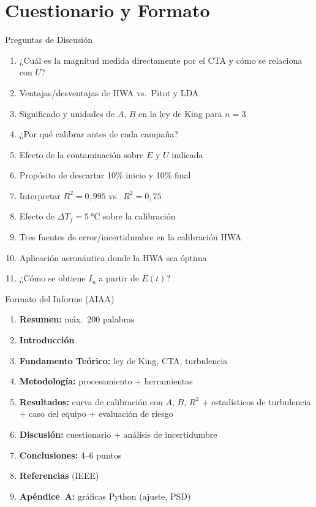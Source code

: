 \documentclass[aspectratio=169,12pt]{beamer}
\begin{document}
\section{Cuestionario y Formato}

\begin{frame}{Preguntas de Discusión}
	\begin{enumerate}\small
		\item ¿Cuál es la magnitud medida directamente por el CTA
		      y cómo se relaciona con $U$?
		\item Ventajas/desventajas de HWA vs.\ Pitot y LDA
		\item Significado y unidades de $A$, $B$ en la ley de King
		      para $n=3$
		\item ¿Por qué calibrar antes de cada campaña?
		\item Efecto de la contaminación sobre $E$ y $U$ indicada
		\item Propósito de descartar 10\% inicio y 10\% final
		\item Interpretar $R^2 = 0{,}995$ vs.\ $R^2 = 0{,}75$
		\item Efecto de $\Delta T_f = \SI{5}{\degreeCelsius}$
		      sobre la calibración
		\item Tres fuentes de error/incertidumbre en la
		      calibración HWA
		\item Aplicación aeronáutica donde la HWA sea óptima
		\item ¿Cómo se obtiene $I_u$ a partir de $E(t)$?
	\end{enumerate}
\end{frame}

\begin{frame}{Formato del Informe (AIAA)}
	\begin{enumerate}
		\item \textbf{Resumen:} máx.\ 200 palabras
		\item \textbf{Introducción}
		\item \textbf{Fundamento Teórico:} ley de King, CTA,
		      turbulencia
		\item \textbf{Metodología:} procesamiento + herramientas
		\item \textbf{Resultados:} curva de calibración con
		      $A$, $B$, $R^2$ + estadísticos de turbulencia
		      + caso del equipo + evaluación de riesgo
		\item \textbf{Discusión:} cuestionario + análisis de
		      incertidumbre
		\item \textbf{Conclusiones:} 4--6 puntos
		\item \textbf{Referencias} (IEEE)
		\item \textbf{Apéndice~A:} gráficas Python (ajuste, PSD)
	\end{enumerate}
\end{frame}
\end{document}
